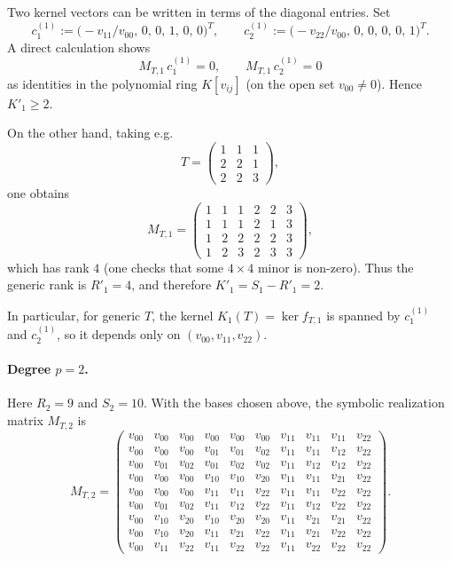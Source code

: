 Two kernel vectors can be written in terms of the diagonal
entries. Set
\[
c^{(1)}_1 := \bigl(-v_{11}/v_{00},\, 0,\,0,\, 1,\, 0,\, 0\bigr)^T,
\qquad
c^{(1)}_2 := \bigl(-v_{22}/v_{00},\, 0,\,0,\, 0,\, 0,\, 1\bigr)^T.
\]
A direct calculation shows
\[
M_{T,1}\,c^{(1)}_1 = 0,
\qquad
M_{T,1}\,c^{(1)}_2 = 0
\]
as identities in the polynomial ring $K[v_{ij}]$ (on the open set
$v_{00}\neq 0$). Hence $K'_1 \ge 2$.

On the other hand, taking e.g.
\[
T =
\begin{pmatrix}
1 & 1 & 1 \\
2 & 2 & 1 \\
2 & 2 & 3
\end{pmatrix},
\]
one obtains
\[
M_{T,1} =
\begin{pmatrix}
1 & 1 & 1 & 2 & 2 & 3 \\
1 & 1 & 1 & 2 & 1 & 3 \\
1 & 2 & 2 & 2 & 2 & 3 \\
1 & 2 & 3 & 2 & 3 & 3
\end{pmatrix},
\]
which has rank $4$ (one checks that some $4\times 4$ minor is non-zero).
Thus the generic rank is $R'_1=4$, and therefore $K'_1 = S_1 - R'_1 = 2$.

In particular, for generic $T$, the kernel $K_1(T) = \ker f_{T,1}$ is
spanned by $c^{(1)}_1$ and $c^{(1)}_2$, so it depends only on
$(v_{00},v_{11},v_{22})$.

\paragraph{Degree $p=2$.}
Here $R_2=9$ and $S_2=10$. With the bases chosen above, the symbolic
realization matrix $M_{T,2}$ is
\[
M_{T,2} =
\begin{pmatrix}
v_{00} & v_{00} & v_{00} & v_{00} & v_{00} & v_{00} & v_{11} & v_{11} & v_{11} & v_{22} \\
v_{00} & v_{00} & v_{00} & v_{01} & v_{01} & v_{02} & v_{11} & v_{11} & v_{12} & v_{22} \\
v_{00} & v_{01} & v_{02} & v_{01} & v_{02} & v_{02} & v_{11} & v_{12} & v_{12} & v_{22} \\
v_{00} & v_{00} & v_{00} & v_{10} & v_{10} & v_{20} & v_{11} & v_{11} & v_{21} & v_{22} \\
v_{00} & v_{00} & v_{00} & v_{11} & v_{11} & v_{22} & v_{11} & v_{11} & v_{22} & v_{22} \\
v_{00} & v_{01} & v_{02} & v_{11} & v_{12} & v_{22} & v_{11} & v_{12} & v_{22} & v_{22} \\
v_{00} & v_{10} & v_{20} & v_{10} & v_{20} & v_{20} & v_{11} & v_{21} & v_{21} & v_{22} \\
v_{00} & v_{10} & v_{20} & v_{11} & v_{21} & v_{22} & v_{11} & v_{21} & v_{22} & v_{22} \\
v_{00} & v_{11} & v_{22} & v_{11} & v_{22} & v_{22} & v_{11} & v_{22} & v_{22} & v_{22}
\end{pmatrix}.
\]


